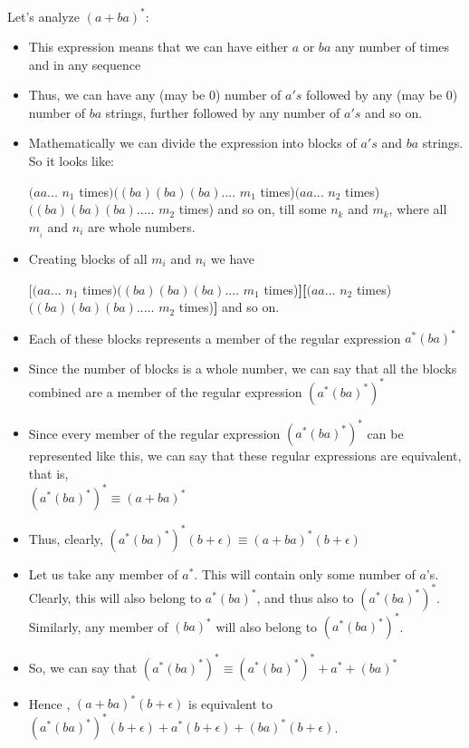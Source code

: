 \documentclass[12pt,a4paper]{article}
\begin{document}
Let's analyze $(a+ba)^*$:
\begin{itemize}
    \item This expression means that we can have either $a$ or $ba$  any number of times and in any sequence
    \item Thus, we can have any (may be 0) number of $a's$ followed by any (may be 0) number of $ba$ strings, further followed by any number of $a's$ and so on.
    \item Mathematically we can divide the expression into blocks of $a's$ and $ba$ strings.
    So it looks like:
    
    $(aa...$ $n_1$ times$)((ba)(ba)(ba)....$ $m_1$ times)$(aa... $ $n_2$ times)$((ba)(ba)(ba).....$ $m_2$ times) and so on, till some $n_k$ and $m_k$, where all $m__i$ and $n_i$ are whole numbers.
    
    \item Creating blocks of all $m_i$ and $n_i$ we have 
    
     $\textbf{[}(aa...$ $n_1$ times$)((ba)(ba)(ba)....$ $m_1$ times)\textbf{][}$(aa... $ $n_2$ times)$((ba)(ba)(ba).....$ $m_2$ times)\textbf{]} and so on.
     \item Each of these blocks represents a member of the regular expression $a^*(ba)^*$
     \item Since the number of blocks is a whole number, we can say that all the blocks combined are a member of the regular expression $(a^*(ba)^*)^*$
     \item Since every member of the regular expression $(a^*(ba)^*)^*$ can be represented like this, we can say that these regular expressions are equivalent, that is, \\$(a^*(ba)^*)^* \equiv (a+ba)^*$ 
     \item Thus, clearly, $(a^*(ba)^*)^*(b+\epsilon) \equiv (a+ba)^*(b+\epsilon)$ 
     \item Let us take any member of $a^*$. This will contain only some number of $a$'s. Clearly, this will also belong to $a^*(ba)^*$, and thus also to $(a^*(ba)^*)^*$. Similarly, any member of $(ba)^*$ will also belong to $(a^*(ba)^*)^*$.
     \item So, we can say that $(a^*(ba)^*)^* \equiv (a^*(ba)^*)^* + a^* + (ba)^*$
     \item Hence , $(a+ba)^*(b+\epsilon)$ is equivalent to $(a^*(ba)^*)^*(b+\epsilon) + a^*(b+\epsilon) + (ba)^*(b + \epsilon )$.
     

\end{itemize}
\end{document}
